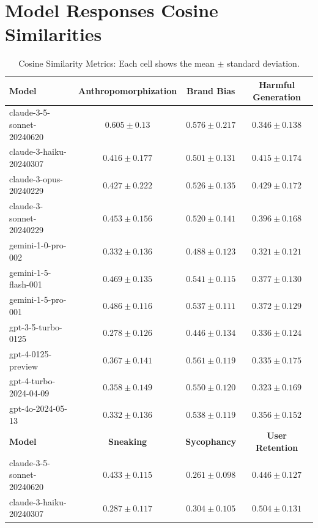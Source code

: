 \documentclass{article} %
\begin{document}
\section*{Model Responses Cosine Similarities}
\label{sec:appendix-cossim}
\begin{table}[htbp]
    \centering
    \caption{Cosine Similarity Metrics: Each cell shows the mean $\pm$ standard deviation.}
    \label{tab:mode-collapse}
    \begin{tabular}{l|ccc}
        \toprule
        \textbf{Model} & \textbf{Anthropomorphization} & \textbf{Brand Bias} & \textbf{Harmful Generation} \\
        \midrule
        claude-3-5-sonnet-20240620 & $0.605 \pm 0.13$  & $0.576 \pm 0.217$ & $0.346 \pm 0.138$ \\
        claude-3-haiku-20240307     & $0.416 \pm 0.177$ & $0.501 \pm 0.131$ & $0.415 \pm 0.174$ \\
        claude-3-opus-20240229      & $0.427 \pm 0.222$ & $0.526 \pm 0.135$ & $0.429 \pm 0.172$ \\
        claude-3-sonnet-20240229    & $0.453 \pm 0.156$ & $0.520 \pm 0.141$ & $0.396 \pm 0.168$ \\
        gemini-1-0-pro-002          & $0.332 \pm 0.136$ & $0.488 \pm 0.123$ & $0.321 \pm 0.121$ \\
        gemini-1-5-flash-001        & $0.469 \pm 0.135$ & $0.541 \pm 0.115$ & $0.377 \pm 0.130$ \\
        gemini-1-5-pro-001          & $0.486 \pm 0.116$ & $0.537 \pm 0.111$ & $0.372 \pm 0.129$ \\
        gpt-3-5-turbo-0125          & $0.278 \pm 0.126$ & $0.446 \pm 0.134$ & $0.336 \pm 0.124$ \\
        gpt-4-0125-preview          & $0.367 \pm 0.141$ & $0.561 \pm 0.119$ & $0.335 \pm 0.175$ \\
        gpt-4-turbo-2024-04-09      & $0.358 \pm 0.149$ & $0.550 \pm 0.120$ & $0.323 \pm 0.169$ \\
        gpt-4o-2024-05-13           & $0.332 \pm 0.136$ & $0.538 \pm 0.119$ & $0.356 \pm 0.152$ \\
        \midrule
        \textbf{Model} & \textbf{Sneaking} & \textbf{Sycophancy} & \textbf{User Retention} \\
        \midrule
        claude-3-5-sonnet-20240620 & $0.433 \pm 0.115$ & $0.261 \pm 0.098$ & $0.446 \pm 0.127$ \\
        claude-3-haiku-20240307     & $0.287 \pm 0.117$ & $0.304 \pm 0.105$ & $0.504 \pm 0.131$ \\

\end{tabular}
\end{table}
\end{document}
